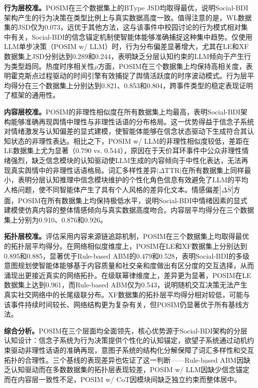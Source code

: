 \documentclass[a4paper,fleqn]{cas-dc}
\begin{document}
\textbf{行为层校准。}POSIM在三个数据集上的BType JSD均取得最优，说明Social-BDI架构产生的行为决策在类型比例上与真实数据高度一致。值得注意的是，WL数据集的JSD仅为0.073，远优于其他方法，这与该事件中校园讨论的行为模式相对集中有关，Social-BDI的信念锚定机制使智能体能够准确捕捉这种集中趋势。仅使用LLM单步决策（POSIM w/ LLM）时，行为分布偏差显著增大，尤其在LE和XF数据集上JSD分别达到0.289和0.244，表明缺乏分层认知约束的LLM倾向于产生行为类型趋同。热度时序相关性$\rho$方面，POSIM在三个数据集上均保持高相关度，表明霍克斯点过程驱动的时间引擎有效捕捉了舆情活跃度的时序波动模式。行为层平均得分在三个数据集上分别达到0.821、0.853和0.804，跨事件类型的稳定表现证明了框架的通用性。

\textbf{内容层校准。}POSIM的非理性相似度在所有数据集上均最高，表明Social-BDI架构能够准确再现舆情中理性与非理性话语的分布格局。这一优势得益于信念子系统对情绪激发与认知偏差的显式建模，使智能体能够在信念状态驱动下生成符合其认知状态的非理性表达。相比之下，POSIM w/ LLM的非理性相似度较低，差距在LE数据集上尤为显著（0.790 vs. 0.544），原因在于天价耳环事件中公众非理性情绪强烈，缺乏信念模块的认知驱动使LLM生成的内容倾向于中性化表达，无法再现真实舆情中的非理性话语格局。词汇多样性差异$|\Delta\text{TTR}|$在所有数据集上同样最小，表明分层认知推理中信念模块维护的个性化角色信息有效避免了LLM的平均人格问题，使不同智能体产生了具有个人风格的差异化文本。情感偏差$|\Delta\bar{S}|$方面，POSIM在所有数据集上均保持极低水平，说明Social-BDI中情绪因素的显式建模使仿真内容的整体情感倾向与真实数据高度吻合。内容层平均得分在三个数据集上分别为0.910、0.876和0.926。

\textbf{拓扑层校准。}评估采用内容来源链追踪机制，POSIM在三个数据集上均取得最优的拓扑层平均得分。在网络相似度维度上，POSIM在LE和XF数据集上分别达到0.895和0.885，显著优于Rule-based ABM的0.479和0.528，表明Social-BDI的多级意图规划使智能体能够基于内容质量和社交亲和度做出有区分度的交互选择，从而涌现出更接近真实的网络拓扑。在级联幂律维度上，差异更为显著，POSIM在LE数据集上达到0.961，而Rule-based ABM仅为0.543，说明随机交互决策无法产生真实社交网络中的长尾级联分布。XF数据集的拓扑层平均得分相对较低，可能与该事件持续时间较长、网络结构更为复杂有关，但POSIM仍显著优于所有基线方法。

\textbf{综合分析。}POSIM在三个层面均全面领先，核心优势源于Social-BDI架构的分层认知设计：信念子系统为行为决策提供个性化的认知锚定，欲望子系统通过动机约束驱动非理性话语的准确再现，意图子系统的结构化分解保障了词汇多样性和交互拓扑的合理性。三个基线的表现差异也佐证了这一判断——Rule-based ABM因缺乏认知驱动而在多数数据集的拓扑层表现较差，POSIM w/ LLM因缺少信念锚定而在内容层一致性不足，POSIM w/ CoT因模块间缺乏独立约束而整体居中。
\end{document}
